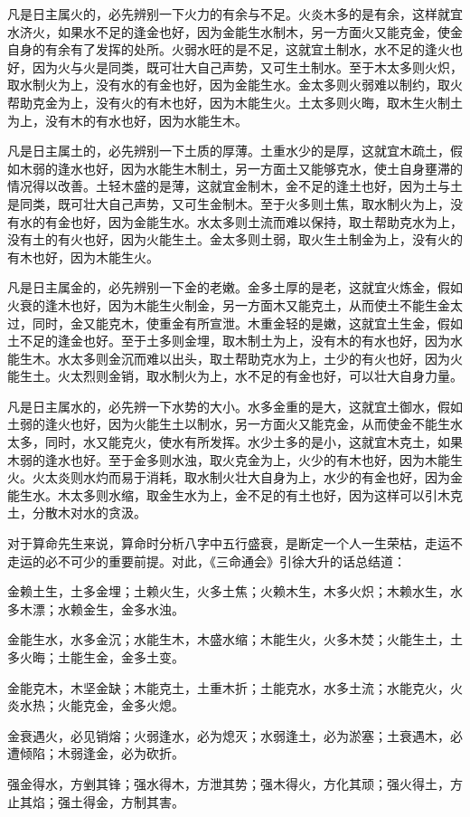 \documentclass[a5paper,oneside,12pt]{ctexbook}
\begin{document}
凡是日主属火的，必先辨别一下火力的有余与不足。火炎木多的是有余，这样就宜水济火，如果水不足的逢金也好，因为金能生水制木，另一方面火又能克金，使金自身的有余有了发挥的处所。火弱水旺的是不足，这就宜土制水，水不足的逢火也好，因为火与火是同类，既可壮大自己声势，又可生土制水。至于木太多则火炽，取水制火为上，没有水的有金也好，因为金能生水。金太多则火弱难以制约，取火帮助克金为上，没有火的有木也好，因为木能生火。土太多则火晦，取木生火制土为上，没有木的有水也好，因为水能生木。

凡是日主属土的，必先辨别一下土质的厚薄。土重水少的是厚，这就宜木疏土，假如木弱的逢水也好，因为水能生木制土，另一方面土又能够克水，使土自身壅滞的情况得以改善。土轻木盛的是薄，这就宜金制木，金不足的逢土也好，因为土与土是同类，既可壮大自己声势，又可生金制木。至于火多则土焦，取水制火为上，没有水的有金也好，因为金能生水。水太多则土流而难以保持，取土帮助克水为上，没有土的有火也好，因为火能生土。金太多则土弱，取火生土制金为上，没有火的有木也好，因为木能生火。

凡是日主属金的，必先辨别一下金的老嫩。金多土厚的是老，这就宜火炼金，假如火衰的逢木也好，因为木能生火制金，另一方面木又能克土，从而使土不能生金太过，同时，金又能克木，使重金有所宣泄。木重金轻的是嫩，这就宜土生金，假如土不足的逢金也好。至于土多则金埋，取木制土为上，没有木的有水也好，因为水能生木。水太多则金沉而难以出头，取土帮助克水为上，土少的有火也好，因为火能生土。火太烈则金销，取水制火为上，水不足的有金也好，可以壮大自身力量。

凡是日主属水的，必先辨一下水势的大小。水多金重的是大，这就宜土御水，假如土弱的逢火也好，因为火能生土以制水，另一方面火又能克金，从而使金不能生水太多，同时，水又能克火，使水有所发挥。水少土多的是小，这就宜木克土，如果木弱的逢水也好。至于金多则水浊，取火克金为上，火少的有木也好，因为木能生火。火太炎则水灼而易于消耗，取水制火壮大自身为上，水少的有金也好，因为金能生水。木太多则水缩，取金生水为上，金不足的有土也好，因为这样可以引木克土，分散木对水的贪汲。

对于算命先生来说，算命时分析八字中五行盛衰，是断定一个人一生荣枯，走运不走运的必不可少的重要前提。对此，《三命通会》引徐大升的话总结道：

\begin{adjustwidth}{2em}{2em}
\setlength{\parindent}{2em}
\setlength{\leftmargin}{3em}
\kaishu
\hspace{2em}金赖土生，土多金埋；土赖火生，火多土焦；火赖木生，木多火炽；木赖水生，水多木漂；水赖金生，金多水浊。\par
金能生水，水多金沉；水能生木，木盛水缩；木能生火，火多木焚；火能生土，土多火晦；土能生金，金多土变。\par
金能克木，木坚金缺；木能克土，土重木折；土能克水，水多土流；水能克火，火炎水热；火能克金，金多火熄。\par
金衰遇火，必见销熔；火弱逢水，必为熄灭；水弱逢土，必为淤塞；土衰遇木，必遭倾陷；木弱逢金，必为砍折。\par
强金得水，方剉其锋；强水得木，方泄其势；强木得火，方化其顽；强火得土，方止其焰；强土得金，方制其害。\par
\end{adjustwidth}
\end{document}
